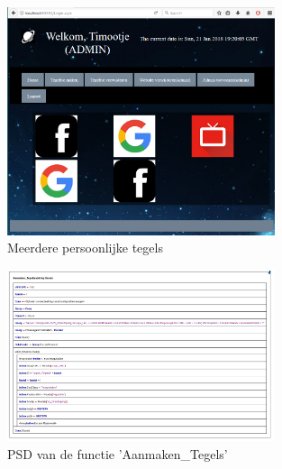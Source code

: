 \documentclass[11pt]{article}
\begin{document}
	\begin{figure}[h]
		\centering
	\includegraphics[width=0.7\textwidth]{AdminDelSite3}
	
	\caption{Meerdere persoonlijke tegels}
	\label{7Tegels}
	
\end{figure}
\newpage
	\begin{figure}[h]
	\centering
	\includegraphics[width=0.7\textwidth]{at}
	
	\caption{PSD van de functie 'Aanmaken\_Tegels'}
	\label{PSDTegel}
	
\end{figure}


	
	
	
	
	
	
	
	
	
	
	
	
	
	
	
	
	
	
	
	
\end{document}
